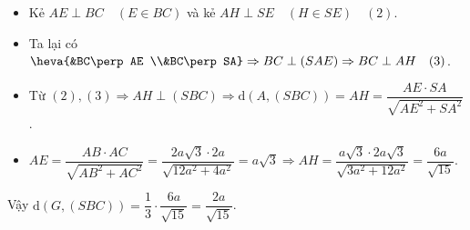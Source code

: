 \begin{ex}
{{	
		}
		\begin{itemize}
			\item Kẻ $ AE\perp BC \quad (E\in BC)$ và kẻ $ AH\perp SE \quad (H\in SE)\quad (2)$.
			\item Ta lại có $ \heva{&BC\perp AE \\&BC\perp SA}\Rightarrow BC\perp (SAE) \Rightarrow BC\perp AH\quad (3)$.
			\item Từ $ (2), (3)\Rightarrow AH\perp (SBC)\Rightarrow \mathrm{d}\left(A, (SBC)\right)=AH=\dfrac{AE\cdot SA}{\sqrt{AE^2+SA^2}} $.
			\item $ AE=\dfrac{AB\cdot AC}{\sqrt{AB^2+AC^2}}=\dfrac{2a\sqrt{3}\cdot 2a}{\sqrt{12a^2+4a^2}}=a\sqrt{3}\Rightarrow AH=\dfrac{a\sqrt{3}\cdot 2a\sqrt{3}}{\sqrt{3a^2+12a^2}}=\dfrac{6a}{\sqrt{15}} $.
		\end{itemize}
		Vậy $ \mathrm{d}\left(G,(SBC)\right)=\dfrac{1}{3}\cdot \dfrac{6a}{\sqrt{15}}=\dfrac{2a}{\sqrt{15}}$.
	}
\end{ex}%
